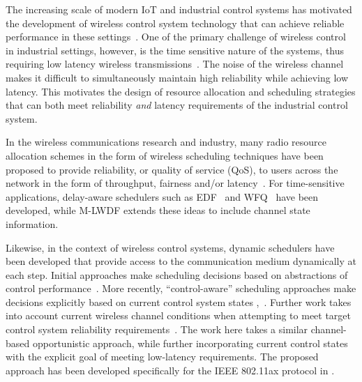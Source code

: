 The increasing scale of modern IoT and industrial control systems has motivated the development of wireless control system technology that can achieve reliable performance in these settings~\cite{varghese2014wireless, li2017review}. One of the primary challenge of wireless control in industrial settings, however, is the time sensitive nature of the systems, thus requiring low latency wireless transmissions~\cite{varghese2014wireless}.  The noise of the wireless channel makes it difficult to simultaneously maintain high reliability while achieving low latency. This motivates the design of resource allocation and scheduling strategies that can both meet reliability \emph{and} latency requirements of the industrial control system.


In the wireless communications research and industry, many radio resource allocation schemes in the form of wireless scheduling techniques have been proposed to provide reliability, or quality of service (QoS), to users across the network in the form of throughput, fairness and/or latency~\cite{cao2001scheduling,wongthavarawat2003packet,fattah2002overview,yaacoub2012survey}. For time-sensitive applications, delay-aware schedulers such as EDF~\cite{wu2014analysis} and WFQ~\cite{lu1999fair} have been developed,  while M-LWDF \cite{andrews2001providing} extends these ideas to include channel state information.


Likewise, in the context of wireless control systems, dynamic schedulers have been developed that provide access to the communication medium dynamically at each step. %
Initial approaches make scheduling decisions based on abstractions of control performance~\cite{Branicky_RM, Liu_Real_time_systems}. More recently, ``control-aware'' scheduling approaches make decisions explicitly based on current control system states ,~\cite{Donkers_switched, Walsh_stability, Hristu_Kumar_interrupt_based, Egerstedt_queue, Hirche_Scheduling_Price, Cervin_event_scheduling, mamduhi2014event,shi2011optimal,han2017optimal}.
%
Further work takes into account current wireless channel conditions when attempting to meet target control system reliability requirements~\cite{GatsisEtal15}. The work here takes a similar channel-based opportunistic approach, while further incorporating current control states with the explicit goal of meeting low-latency requirements. The proposed approach has been developed specifically for the IEEE 802.11ax protocol in \cite{EisenEtal18}. 



